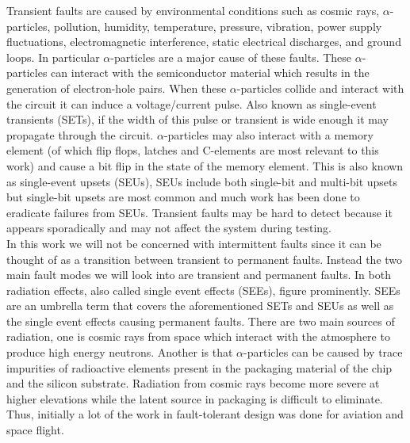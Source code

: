 \documentclass[12pt]{report}
\begin{document}
Transient faults are caused by environmental conditions such as cosmic rays, $\alpha$-particles, pollution, humidity, temperature, pressure, vibration, power supply fluctuations, electromagnetic interference, static electrical discharges, and ground loops. In particular $\alpha$-particles are a major cause of these faults. These $\alpha$-particles can interact with the semiconductor material which results in the generation of electron-hole pairs. When these $\alpha$-particles collide and interact with the circuit it can induce a voltage/current pulse. Also known as single-event transients (SETs), if the width of this pulse or transient is wide enough it may propagate through the circuit. $\alpha$-particles may also interact with a memory element (of which flip flops, latches and C-elements are most relevant to this work) and cause a bit flip in the state of the memory element. This is also known as single-event upsets (SEUs), SEUs include both single-bit and multi-bit upsets but single-bit upsets are most common and much work has been done to eradicate failures from SEUs. 
Transient faults may be hard to detect because it appears sporadically and may not affect the system during testing. \\

In this work we will not be concerned with intermittent faults since it can be thought of as a transition between transient to permanent faults. Instead the two main fault modes we will look into are transient and permanent faults. In both radiation effects, also called single event effects (SEEs), figure prominently. SEEs are an umbrella term that covers the aforementioned SETs and SEUs as well as the single event effects causing permanent faults. There are two main sources of radiation, one is cosmic rays from space which interact with the atmosphere to produce high energy neutrons. Another is that $\alpha$-particles can be caused by trace impurities of radioactive elements present in the packaging material of the chip and the silicon substrate. Radiation from cosmic rays become more severe at higher elevations while the latent source in packaging is difficult to eliminate. Thus, initially a lot of the work in fault-tolerant design was done for aviation and space flight.


\end{document}

